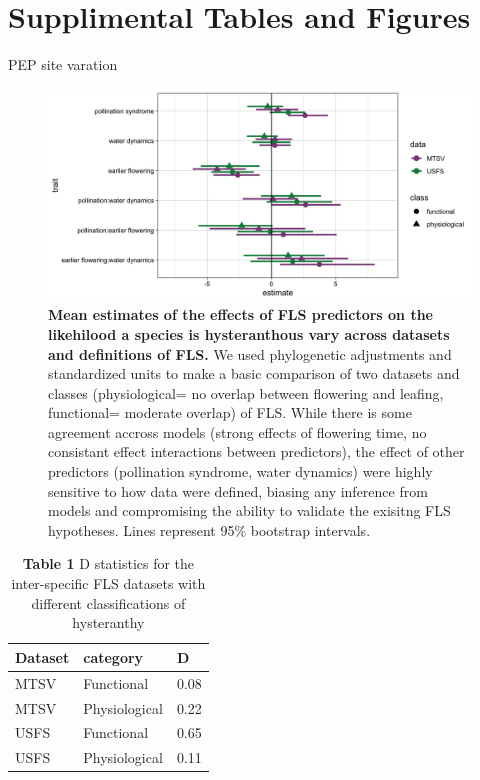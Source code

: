 \documentclass[12pt]{article}\usepackage[]{graphicx}\usepackage[]{color}
\makeatletter
\newenvironment{kframe}{%
 \def\at@end@of@kframe{}%
 \ifinner\ifhmode%
  \def\at@end@of@kframe{\end{minipage}}%
  \begin{minipage}{\columnwidth}%
 \fi\fi%
 \def\FrameCommand##1{\hskip\@totalleftmargin \hskip-\fboxsep
 \colorbox{shadecolor}{##1}\hskip-\fboxsep
     \hskip-\linewidth \hskip-\@totalleftmargin \hskip\columnwidth}%
 \MakeFramed {\advance\hsize-\width
   \@totalleftmargin\z@ \linewidth\hsize
   \@setminipage}}%
 {\par\unskip\endMakeFramed%
 \at@end@of@kframe}
\makeatother
\begin{document}
\section*{Supplimental Tables and Figures}
PEP site varation
\begin{figure}[h!]
    \centering
 \includegraphics[width=\textwidth]{..//MTSV_USFS.jpeg} 
    \caption{\textbf{Mean estimates of the effects of FLS predictors on the likehilood a species is hysteranthous vary across datasets and definitions of FLS.}  We used phylogenetic adjustments and standardized units to make a basic comparison of two datasets and classes (physiological= no overlap between flowering and leafing, functional= moderate overlap) of FLS. While there is some agreement accross models (strong effects of flowering time, no consistant effect interactions between predictors), the effect of other predictors (pollination syndrome, water dynamics) were highly sensitive to how data were defined, biasing any inference from models and compromising the ability to validate the exisitng FLS hypotheses. Lines represent 95\% bootstrap intervals.}
    \label{fig: muplots.USMT}
\end{figure}

\begin{kframe}


{\ttfamily\noindent\color{warningcolor}{\#\# Warning: package 'MASS' was built under R version 3.4.3}}\end{kframe}%
\begin{table}[ht]
\centering
\begin{tabular}{l|l|l}
  \hline
Dataset & category & D \\ 
  \hline
MTSV & Functional & 0.08 \\ 
  MTSV & Physiological & 0.22 \\ 
  USFS & Functional & 0.65 \\ 
  USFS & Physiological & 0.11 \\ 
   \hline
\end{tabular}
\caption{\textbf{Table 1} D statistics for the inter-specific FLS datasets with different classifications of hysteranthy} 
\label{tab:Table S1}
\end{table}
\end{document}
